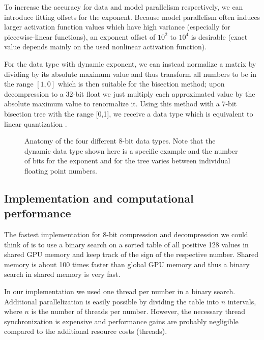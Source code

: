 \documentclass{article} %
\begin{document}
To increase the accuracy for data and model parallelism respectively, we can introduce fitting offsets for the exponent. Because model parallelism often induces larger activation function values which have high variance (especially for piecewise-linear functions), an exponent offset of $10^2$ to $10^4$ is desirable (exact value depends mainly on the used nonlinear activation function). 

For the data type with dynamic exponent, we can instead normalize a matrix by dividing by its absolute maximum value and thus transform all numbers to be in the range $[1,0]$ which is then suitable for the bisection method; upon decompression to a 32-bit float we just multiply each approximated value by the absolute maximum value to renormalize it. Using this method with a 7-bit bisection tree with the range [0,1], we receive a data type which is equivalent to linear quantization \citep{vanhoucke2011improving}.


\begin{figure}[h]
	\begin{center}
	\end{center}
	\caption{Anatomy of the four different 8-bit data types. Note that the dynamic data type shown here is a specific example and the number of bits for the exponent and for the tree varies between individual floating point numbers.}
\end{figure}

\subsection{Implementation and computational performance}

The fastest implementation for 8-bit compression and decompression we could think of is to use a binary search on a sorted table of all positive 128 values in shared GPU memory and keep track of the sign of the respective number. Shared memory is about 100 times faster than global GPU memory and thus a binary search in shared memory is very fast. 

In our implementation we used one thread per number in a binary search. Additional parallelization is easily possible by dividing the table into $n$ intervals, where $n$ is the number of threads per number. However, the necessary thread synchronization is expensive and performance gains are probably negligible compared to the additional resource costs (threads). 
\end{document}
